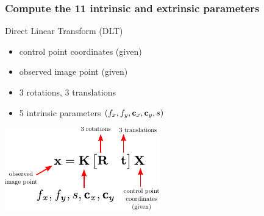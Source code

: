 \begin{frame}
  \frametitle{Compute the 11 intrinsic and extrinsic parameters}
  Direct Linear Transform (DLT)
  \begin{itemize}
    \item control point coordinates (given)
    \item observed image point  (given)
    \item 3 rotations, 3 translations
    \item 5 intrinsic parameters $(f_{x}, f_{y}, \boldsymbol{\mathbf{c}}_{x}, \boldsymbol{\mathbf{c}}_{y}, s)$
  \end{itemize}

  \begin{center}
    \includegraphics[width=0.5\columnwidth]{./images/projection_matrix_unknowns.pdf}
  \end{center}
\end{frame}


